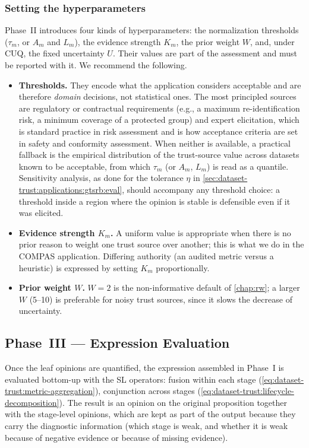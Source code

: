 \subsubsection{Setting the hyperparameters}
\label{sec:dataset-trust:framework:hyperparameters}
Phase~II introduces four kinds of hyperparameters: the normalization thresholds ($\tau_m$, or $A_m$ and $L_m$), the evidence strength $K_m$, the prior weight $W$, and, under \ac{CUQ}, the fixed uncertainty $U$. Their values are part of the assessment and must be reported with it. We recommend the following.
\begin{itemize}
  \item \textbf{Thresholds.} They encode what the application considers acceptable and are therefore \emph{domain} decisions, not statistical ones. The most principled sources are regulatory or contractual requirements (e.g., a maximum re-identification risk, a minimum coverage of a protected group) and expert elicitation, which is standard practice in risk assessment and is how acceptance criteria are set in safety and conformity assessment. When neither is available, a practical fallback is the empirical distribution of the trust-source value across datasets known to be acceptable, from which $\tau_m$ (or $A_m$, $L_m$) is read as a quantile. Sensitivity analysis, as done for the tolerance $\eta$ in \cref{sec:dataset-trust:applications:gtsrb:eval}, should accompany any threshold choice: a threshold inside a region where the opinion is stable is defensible even if it was elicited.
  \item \textbf{Evidence strength $K_m$.} A uniform value is appropriate when there is no prior reason to weight one trust source over another; this is what we do in the \ac{COMPAS} application. Differing authority (an audited metric versus a heuristic) is expressed by setting $K_m$ proportionally.
  \item \textbf{Prior weight $W$.} $W = 2$ is the non-informative default of \cref{chap:rw}; a larger $W$ (5--10) is preferable for noisy trust sources, since it slows the decrease of uncertainty.
\end{itemize}

\subsection{Phase~III --- Expression Evaluation}
\label{sec:dataset-trust:framework:phase3}
Once the leaf opinions are quantified, the expression assembled in Phase~I is evaluated bottom-up with the \ac{SL} operators: fusion within each stage (\cref{eq:dataset-trust:metric-aggregation}), conjunction across stages (\cref{eq:dataset-trust:lifecycle-decomposition}). The result is an opinion on the original proposition together with the stage-level opinions, which are kept as part of the output because they carry the diagnostic information (which stage is weak, and whether it is weak because of negative evidence or because of missing evidence).

